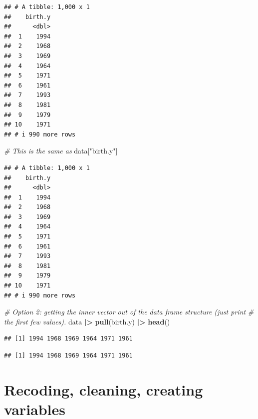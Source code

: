\documentclass[
]{book}
\newenvironment{Shaded}{\begin{snugshade}}{\end{snugshade}}
\newcommand{\CommentTok}[1]{\textcolor[rgb]{0.56,0.35,0.01}{\textit{#1}}}
\newcommand{\FunctionTok}[1]{\textcolor[rgb]{0.13,0.29,0.53}{\textbf{#1}}}
\newcommand{\NormalTok}[1]{#1}
\newcommand{\SpecialCharTok}[1]{\textcolor[rgb]{0.81,0.36,0.00}{\textbf{#1}}}
\newcommand{\StringTok}[1]{\textcolor[rgb]{0.31,0.60,0.02}{#1}}
\begin{document}
\begin{verbatim}
## # A tibble: 1,000 x 1
##    birth.y
##      <dbl>
##  1    1994
##  2    1968
##  3    1969
##  4    1964
##  5    1971
##  6    1961
##  7    1993
##  8    1981
##  9    1979
## 10    1971
## # i 990 more rows
\end{verbatim}

\begin{Shaded}
\begin{Highlighting}[]
\CommentTok{\# This is the same as}
\NormalTok{data[}\StringTok{"birth.y"}\NormalTok{]}
\end{Highlighting}
\end{Shaded}

\begin{verbatim}
## # A tibble: 1,000 x 1
##    birth.y
##      <dbl>
##  1    1994
##  2    1968
##  3    1969
##  4    1964
##  5    1971
##  6    1961
##  7    1993
##  8    1981
##  9    1979
## 10    1971
## # i 990 more rows
\end{verbatim}

\begin{Shaded}
\begin{Highlighting}[]
\CommentTok{\# Option 2: getting the inner vector out of the data frame structure (just print}
\CommentTok{\# the first few values).}
\NormalTok{data }\SpecialCharTok{|\textgreater{}} 
  \FunctionTok{pull}\NormalTok{(birth.y) }\SpecialCharTok{|\textgreater{}} 
  \FunctionTok{head}\NormalTok{()}
\end{Highlighting}
\end{Shaded}

\begin{verbatim}
## [1] 1994 1968 1969 1964 1971 1961
\end{verbatim}

\begin{Shaded}
\end{Shaded}

\begin{verbatim}
## [1] 1994 1968 1969 1964 1971 1961
\end{verbatim}

\hypertarget{recoding-cleaning-creating-variables}{%
\section{Recoding, cleaning, creating variables}\label{recoding-cleaning-creating-variables}}
\end{document}
